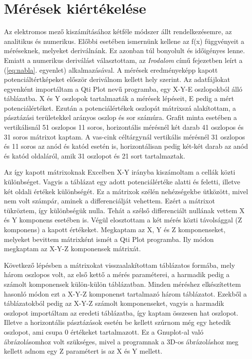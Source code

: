 \section{Mérések kiértékelése}

Az elektromos mező kiszámításához kétféle módszer állt rendelkezésemre, az analitikus és numerikus. Előbbi esetében ismernünk kellene az f(x) függvényeit a méréseknek, melyeket deriválnánk. Ez azonban túl bonyolult és időigényes lenne. Emiatt a numerikus deriválást választottam, az \emph{Irodalom} című fejezetben leírt a (\ref{eq:nabla}. egyenlet) alkalmazásával. A mérések eredményeképp kapott potenciáltértképeket először deriválnom kellett hely szerint. Az adatfájlokat egyenként importáltam a Qti Plot nevű programba, egy X-Y-E oszlopokból álló táblázatba. X és Y oszlopok tartalmazták a mérések lépéseit, E pedig a mért potenciálértéket. Ezután a potenciálértékek oszlopát mátrixszá alakítottam, a pásztázási területekkel arányos oszlop és sor számúra. Grafit minta esetében a vertikálisnál 51 oszlopos 11 soros, horizontális mérésnél két darab 41 oszlopos és 31 soros mátrixot kaptam. A vas-cink céltárgynál vertikális mérésnél 31 oszlopos és 11 soros az anód és katód esetén is, horizontálisan pedig két-két darab az anód és katód oldaláról, amik 31 oszlopot és 21 sort tartalmaztak. 

Az így kapott mátrixoknak Excelben X-Y irányba kiszámoltam a cellák közti különbséget. Vagyis a táblázat egy adott potenciálértéke alatti és feletti, illetve két oldali értékek különbségét. Ez a mátrixok szélén nehézségekbe ütközött, mivel nem volt számpár, aminek a differenciálját vehettem. Ezért a mátrixot tükröztem, így különbségük nulla. Tehát a szélső differenciált nullának vettem X és Y komponens esetében is. Végül elosztottam a két mérés közti távolsággal (Z komponens) a kapott értékeket. Megkaptam az X, Y és Z komponenseket, melyeket bevittem mátrixként ismét a Qti Plot programba. Ily módon megkaptam az X-Y-Z komponensek mátrixát.

Következő lépésben a mátrixokat visszaalakítottam táblázatos formába, mely három oszlopos volt, az első kettő a mérés paraméterei, a harmadik pedig a számolt komponensek külön-külön táblázatban. Minden méréshez elkészítettem hasonló módon ezt a X-Y-Z komponenst tartalmazó három táblázatot. Ezekből a táblázatokból pedig az X-Y-Z számolt komponenseket, vagyis a harmadik oszlopot importáltam az eredeti táblázatba, így kaptam összesen hat oszlopot. Illetve a horizontális pásztázások esetén be kellett szúrnom még egy hetedik oszlopot, ami csupa 0 értékeket tartalmazott. Ez a Gnuplot-al való ábrázolásomhoz volt szükséges, mivel a programnak a 3D-os ábrázoláshoz meg kellett adnom egy Z paramétert is az X és Y mellett. 

